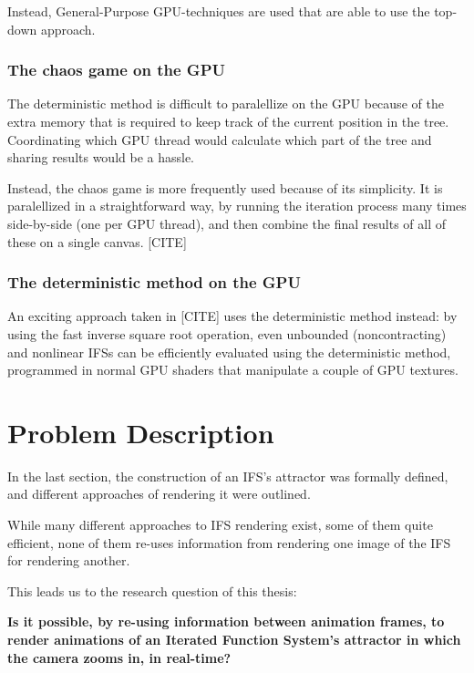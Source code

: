 \documentclass[11pt]{article}
\begin{document}
Instead, General-Purpose GPU-techniques are used that are able to use the top-down approach.

\subsubsection{The chaos game on the GPU}
\label{sec:org5f6b0ab}
\label{subsection:chaos_game_gpu}

The deterministic method is difficult to paralellize on the GPU because of the extra memory that is required to keep track of the current position in the tree.
Coordinating which GPU thread would calculate which part of the tree and sharing results would be a hassle.

Instead, the chaos game is more frequently used because of its simplicity. It is paralellized in a straightforward way, by running the iteration process many times side-by-side (one per GPU thread),
and then combine the final results of all of these on a single canvas. [CITE]

\subsubsection{The deterministic method on the GPU}
\label{sec:org45b5eeb}
\label{subsection:deterministic_gpu}

An exciting approach taken in [CITE] uses the deterministic method instead:
by using the fast inverse square root operation, even unbounded (noncontracting) and nonlinear IFSs can be efficiently
evaluated using the deterministic method, programmed in normal GPU shaders that manipulate a couple of GPU textures.


\section{Problem Description}
\label{sec:orgd6f1ab0}

In the last section, the construction of an IFS's attractor was formally defined, 
and different approaches of rendering it were outlined.

While many different approaches to IFS rendering exist, some of them quite efficient,
none of them re-uses information from rendering one image of the IFS for rendering another.

This leads us to the research question of this thesis:

\textbf{\textbf{Is it possible, by re-using information between animation frames, to render animations of an Iterated Function System's attractor in which the camera zooms in, in real-time?}}
\end{document}

